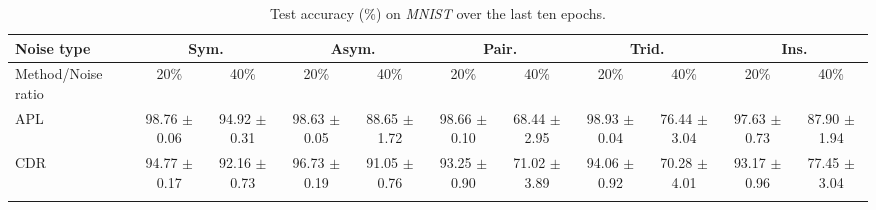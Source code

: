 \documentclass[11pt]{article}
\begin{document}
\begin{table}[!t]
    \small
\centering
	\begin{tabular}{l|cc|cc|cc|cc|cc} 
		\Xhline{3\arrayrulewidth}	 	
		   Noise type &\multicolumn{2}{c|}{Sym.}&\multicolumn{2}{c|}{Asym.}&\multicolumn{2}{c|}{Pair.}&\multicolumn{2}{c|}{Trid.}&\multicolumn{2}{c}{Ins.}\\
			\hline
		   Method/Noise ratio&  20\% & 40\%& 20\% & 40\% &20\% & 40\%& 20\% & 40\% & 20\% & 40\%\\
			\hline
			 APL& \makecell{98.76\\ $\pm$\scriptsize{0.06}} & \makecell{94.92\\ $\pm$\scriptsize{0.31}} & \makecell{98.63\\ $\pm$\scriptsize{0.05}} & \makecell{88.65\\ $\pm$\scriptsize{1.72}} & \makecell{98.66\\ $\pm$\scriptsize{0.10}} & \makecell{68.44\\ $\pm$\scriptsize{2.95}} & \makecell{98.93\\ $\pm$\scriptsize{0.04}} & \makecell{76.44\\ $\pm$\scriptsize{3.04}} & \makecell{97.63\\ $\pm$\scriptsize{0.73}} & \makecell{87.90\\ $\pm$\scriptsize{1.94}}\\
			\hline
			 CDR & \makecell{94.77\\ $\pm$\scriptsize{0.17}} & \makecell{92.16\\ $\pm$\scriptsize{0.73}} & \makecell{96.73\\ $\pm$\scriptsize{0.19}} & \makecell{91.05\\ $\pm$\scriptsize{0.76}} & \makecell{93.25\\ $\pm$\scriptsize{0.90}} & \makecell{71.02\\ $\pm$\scriptsize{3.89}} & \makecell{94.06\\ $\pm$\scriptsize{0.92}} & \makecell{70.28\\ $\pm$\scriptsize{4.01}} & \makecell{93.17\\ $\pm$\scriptsize{0.96}} & \makecell{77.45\\ $\pm$\scriptsize{3.04}}\\
		\Xhline{3\arrayrulewidth}
\end{tabular}
\caption
		{
Test accuracy (\%) on \textit{MNIST} over the last ten epochs.
		}
	\label{tab:com_mnist}
\end{table}		
\end{document}
